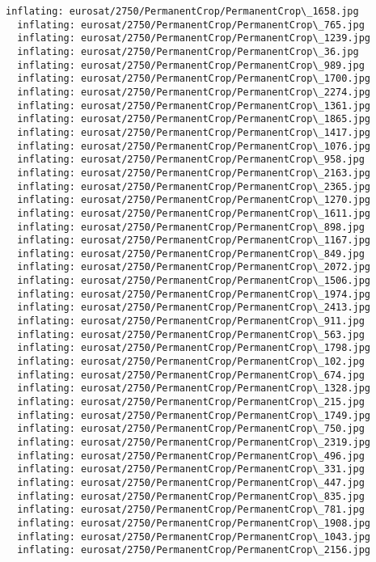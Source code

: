 \documentclass[11pt]{article}
\begin{document}
\begin{Verbatim}[commandchars=\\\{\}]
  inflating: eurosat/2750/PermanentCrop/PermanentCrop\_1658.jpg
  inflating: eurosat/2750/PermanentCrop/PermanentCrop\_765.jpg
  inflating: eurosat/2750/PermanentCrop/PermanentCrop\_1239.jpg
  inflating: eurosat/2750/PermanentCrop/PermanentCrop\_36.jpg
  inflating: eurosat/2750/PermanentCrop/PermanentCrop\_989.jpg
  inflating: eurosat/2750/PermanentCrop/PermanentCrop\_1700.jpg
  inflating: eurosat/2750/PermanentCrop/PermanentCrop\_2274.jpg
  inflating: eurosat/2750/PermanentCrop/PermanentCrop\_1361.jpg
  inflating: eurosat/2750/PermanentCrop/PermanentCrop\_1865.jpg
  inflating: eurosat/2750/PermanentCrop/PermanentCrop\_1417.jpg
  inflating: eurosat/2750/PermanentCrop/PermanentCrop\_1076.jpg
  inflating: eurosat/2750/PermanentCrop/PermanentCrop\_958.jpg
  inflating: eurosat/2750/PermanentCrop/PermanentCrop\_2163.jpg
  inflating: eurosat/2750/PermanentCrop/PermanentCrop\_2365.jpg
  inflating: eurosat/2750/PermanentCrop/PermanentCrop\_1270.jpg
  inflating: eurosat/2750/PermanentCrop/PermanentCrop\_1611.jpg
  inflating: eurosat/2750/PermanentCrop/PermanentCrop\_898.jpg
  inflating: eurosat/2750/PermanentCrop/PermanentCrop\_1167.jpg
  inflating: eurosat/2750/PermanentCrop/PermanentCrop\_849.jpg
  inflating: eurosat/2750/PermanentCrop/PermanentCrop\_2072.jpg
  inflating: eurosat/2750/PermanentCrop/PermanentCrop\_1506.jpg
  inflating: eurosat/2750/PermanentCrop/PermanentCrop\_1974.jpg
  inflating: eurosat/2750/PermanentCrop/PermanentCrop\_2413.jpg
  inflating: eurosat/2750/PermanentCrop/PermanentCrop\_911.jpg
  inflating: eurosat/2750/PermanentCrop/PermanentCrop\_563.jpg
  inflating: eurosat/2750/PermanentCrop/PermanentCrop\_1798.jpg
  inflating: eurosat/2750/PermanentCrop/PermanentCrop\_102.jpg
  inflating: eurosat/2750/PermanentCrop/PermanentCrop\_674.jpg
  inflating: eurosat/2750/PermanentCrop/PermanentCrop\_1328.jpg
  inflating: eurosat/2750/PermanentCrop/PermanentCrop\_215.jpg
  inflating: eurosat/2750/PermanentCrop/PermanentCrop\_1749.jpg
  inflating: eurosat/2750/PermanentCrop/PermanentCrop\_750.jpg
  inflating: eurosat/2750/PermanentCrop/PermanentCrop\_2319.jpg
  inflating: eurosat/2750/PermanentCrop/PermanentCrop\_496.jpg
  inflating: eurosat/2750/PermanentCrop/PermanentCrop\_331.jpg
  inflating: eurosat/2750/PermanentCrop/PermanentCrop\_447.jpg
  inflating: eurosat/2750/PermanentCrop/PermanentCrop\_835.jpg
  inflating: eurosat/2750/PermanentCrop/PermanentCrop\_781.jpg
  inflating: eurosat/2750/PermanentCrop/PermanentCrop\_1908.jpg
  inflating: eurosat/2750/PermanentCrop/PermanentCrop\_1043.jpg
  inflating: eurosat/2750/PermanentCrop/PermanentCrop\_2156.jpg

\end{Verbatim}
\end{document}
